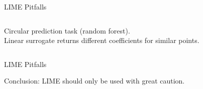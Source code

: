 \documentclass[aspectratio=169]{../latex_main/tntbeamer}  %
\begin{document}
\begin{frame}{LIME Pitfalls }
\begin{columns}
\begin{column}{0.48\textwidth}
\begin{center}
	\tiny{Circular prediction task (random forest).\\ Linear surrogate returns different coefficients for similar points.}
	
	\end{center}
\end{column}
\end{columns}

\end{frame}

\begin{frame}[c]{LIME Pitfalls}

\alert{Conclusion: LIME should only be used with great caution.}

\end{frame}
\end{document}
